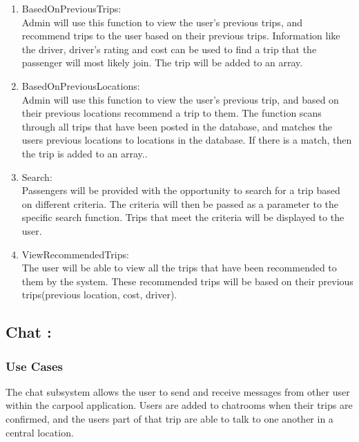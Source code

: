 \documentclass[hidelinks, 12pt, a4paper]{article}
\begin{document}
\begin{enumerate}[label=U1.\arabic*]
      \item BasedOnPreviousTrips:\\
            Admin will use this function to view the user’s previous trips, and recommend trips to the user based on their previous trips. Information like the driver, driver’s rating and cost can be used to find a trip that the passenger will most likely join. The trip will be added to an array.\\

      \item BasedOnPreviousLocations: \\
            Admin will use this function to view the user’s previous trip, and based on their previous locations recommend a trip to them. The function scans through all trips that have been posted in the database, and matches the users  previous locations to locations in the database. If there is a match, then the trip is added to an array..\\

      \item Search:\\
            Passengers will be provided with the opportunity to search for a trip based on different criteria. The criteria will then be passed as a parameter to the specific search function. Trips that meet the criteria will be displayed to the user.\\

      \item ViewRecommendedTrips:\\
            The user will be able to view all the trips that have been recommended to them by the system. These recommended trips will be based on their previous trips(previous location, cost, driver). \\

\end{enumerate}
\newpage
\subsection{Chat :}
\subsubsection{Use Cases}
The chat subsystem allows the user to send and receive messages from other user within the carpool application. Users are added to chatrooms when their trips are confirmed, and the users part of that trip are able to talk to one another in a central location.
\end{document}
